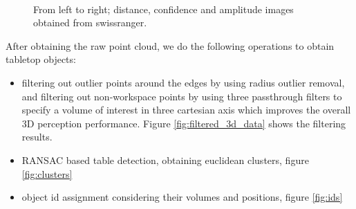 \documentclass[runningheads,a4paper]{llncs}
\begin{document}
\begin{figure}
\centering
\mbox{\quad
{}\quad
{}}
\caption{From left to right; distance, confidence and amplitude images obtained from swissranger.} \label{fig:sr4k_data}
\end{figure}

After obtaining the raw point cloud, we do the following operations to obtain tabletop objects:
\begin{itemize}
 \item filtering out outlier points around the edges by using radius outlier removal, and filtering out non-workspace points by using three passthrough filters to specify a volume of interest in three cartesian axis which improves the overall 3D perception performance. Figure \ref{fig:filtered_3d_data} shows the filtering results.
 \item RANSAC based table detection, obtaining euclidean clusters, figure \ref{fig:clusters}
 \item object id assignment considering their volumes and positions, figure \ref{fig:ids}
\end{itemize}
\end{document}

